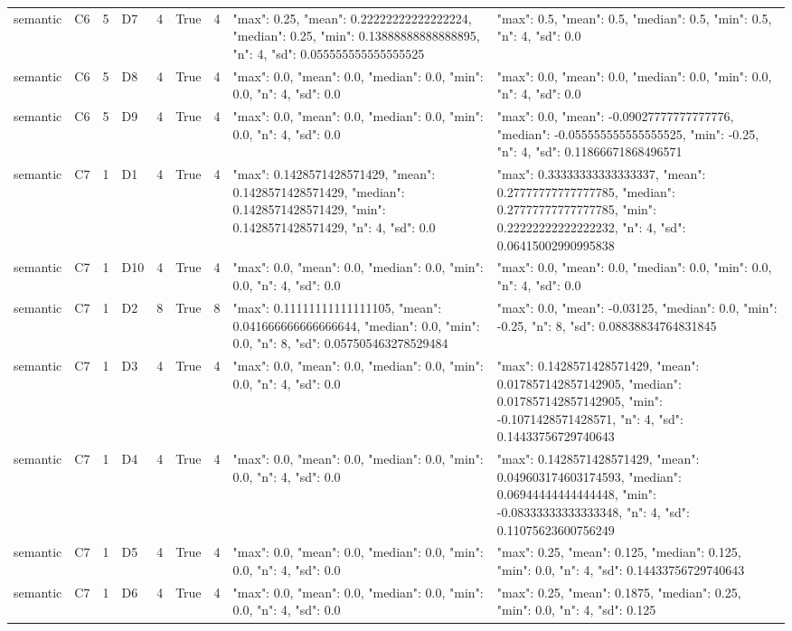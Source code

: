 \begin{tabular}{lllllllll}
semantic & C6 & 5 & D7 & 4 & True & 4 & {"max": 0.25, "mean": 0.22222222222222224, "median": 0.25, "min": 0.13888888888888895, "n": 4, "sd": 0.055555555555555525} & {"max": 0.5, "mean": 0.5, "median": 0.5, "min": 0.5, "n": 4, "sd": 0.0} \\
semantic & C6 & 5 & D8 & 4 & True & 4 & {"max": 0.0, "mean": 0.0, "median": 0.0, "min": 0.0, "n": 4, "sd": 0.0} & {"max": 0.0, "mean": 0.0, "median": 0.0, "min": 0.0, "n": 4, "sd": 0.0} \\
semantic & C6 & 5 & D9 & 4 & True & 4 & {"max": 0.0, "mean": 0.0, "median": 0.0, "min": 0.0, "n": 4, "sd": 0.0} & {"max": 0.0, "mean": -0.09027777777777776, "median": -0.055555555555555525, "min": -0.25, "n": 4, "sd": 0.11866671868496571} \\
semantic & C7 & 1 & D1 & 4 & True & 4 & {"max": 0.1428571428571429, "mean": 0.1428571428571429, "median": 0.1428571428571429, "min": 0.1428571428571429, "n": 4, "sd": 0.0} & {"max": 0.33333333333333337, "mean": 0.27777777777777785, "median": 0.27777777777777785, "min": 0.22222222222222232, "n": 4, "sd": 0.06415002990995838} \\
semantic & C7 & 1 & D10 & 4 & True & 4 & {"max": 0.0, "mean": 0.0, "median": 0.0, "min": 0.0, "n": 4, "sd": 0.0} & {"max": 0.0, "mean": 0.0, "median": 0.0, "min": 0.0, "n": 4, "sd": 0.0} \\
semantic & C7 & 1 & D2 & 8 & True & 8 & {"max": 0.11111111111111105, "mean": 0.041666666666666644, "median": 0.0, "min": 0.0, "n": 8, "sd": 0.057505463278529484} & {"max": 0.0, "mean": -0.03125, "median": 0.0, "min": -0.25, "n": 8, "sd": 0.08838834764831845} \\
semantic & C7 & 1 & D3 & 4 & True & 4 & {"max": 0.0, "mean": 0.0, "median": 0.0, "min": 0.0, "n": 4, "sd": 0.0} & {"max": 0.1428571428571429, "mean": 0.017857142857142905, "median": 0.017857142857142905, "min": -0.1071428571428571, "n": 4, "sd": 0.14433756729740643} \\
semantic & C7 & 1 & D4 & 4 & True & 4 & {"max": 0.0, "mean": 0.0, "median": 0.0, "min": 0.0, "n": 4, "sd": 0.0} & {"max": 0.1428571428571429, "mean": 0.049603174603174593, "median": 0.06944444444444448, "min": -0.08333333333333348, "n": 4, "sd": 0.11075623600756249} \\
semantic & C7 & 1 & D5 & 4 & True & 4 & {"max": 0.0, "mean": 0.0, "median": 0.0, "min": 0.0, "n": 4, "sd": 0.0} & {"max": 0.25, "mean": 0.125, "median": 0.125, "min": 0.0, "n": 4, "sd": 0.14433756729740643} \\
semantic & C7 & 1 & D6 & 4 & True & 4 & {"max": 0.0, "mean": 0.0, "median": 0.0, "min": 0.0, "n": 4, "sd": 0.0} & {"max": 0.25, "mean": 0.1875, "median": 0.25, "min": 0.0, "n": 4, "sd": 0.125} \\

\end{tabular}
